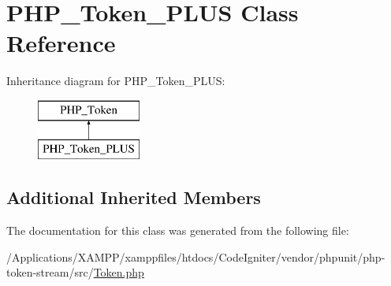 \hypertarget{class_p_h_p___token___p_l_u_s}{}\section{P\+H\+P\+\_\+\+Token\+\_\+\+P\+L\+US Class Reference}
\label{class_p_h_p___token___p_l_u_s}
Inheritance diagram for P\+H\+P\+\_\+\+Token\+\_\+\+P\+L\+US\+:\begin{figure}[H]
\begin{center}
\leavevmode
\includegraphics[height=2.000000cm]{class_p_h_p___token___p_l_u_s}
\end{center}
\end{figure}
\subsection*{Additional Inherited Members}


The documentation for this class was generated from the following file\+:\begin{DoxyCompactItemize}
\item 
/\+Applications/\+X\+A\+M\+P\+P/xamppfiles/htdocs/\+Code\+Igniter/vendor/phpunit/php-\/token-\/stream/src/\mbox{\hyperlink{_token_8php}{Token.\+php}}\end{DoxyCompactItemize}
